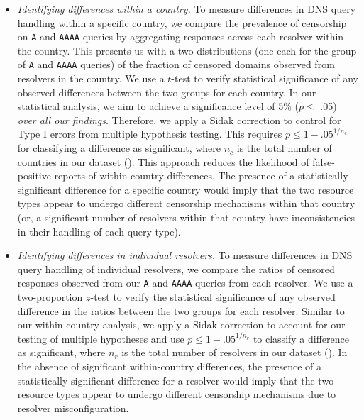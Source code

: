 \begin{itemize}
  \item {\it Identifying differences within a country.} To measure differences
    in DNS query handling within a specific country, we compare the prevalence
    of censorship on {\tt A} and {\tt AAAA} queries by aggregating responses
    across {each resolver within the country}. This presents us with a two
    distributions (one each for the group of {\tt A} and {\tt AAAA} queries) of
    the fraction of censored domains observed from resolvers in the country.
    We use a $t$-test to verify statistical significance of any observed
    differences between the two groups for each country. In our statistical
    analysis, we aim to achieve a significance level of 5\% ($p \leq$  .05)
    \emph{over all our findings}. Therefore, we apply a Sidak correction
    \cite{Sidak} to control for Type I errors from multiple hypothesis testing.
    This requires $p \leq 1-{.05}^{1/n_{c}}$ for classifying a difference as
    significant, where $n_c$ is the total number of countries in our dataset
    (). This approach reduces the likelihood of false-positive
    reports of within-country differences.
    The presence of a statistically significant difference for a specific
    country would imply that the two resource types appear to undergo different
    censorship mechanisms within that country (or, a significant number of
    resolvers within that country have inconsistencies in their handling of
    each query type).

  \item {\it Identifying differences in individual resolvers.} To measure
    differences in DNS query handling of individual resolvers, we compare the
    ratios of censored responses observed from our {\tt A} and {\tt AAAA}
    queries {from each resolver}. 
    We use a two-proportion $z$-test to verify the statistical significance of
    any observed difference in the ratios between the two groups for each
    resolver. Similar to our within-country analysis, we apply a Sidak
    correction to account for our testing of multiple hypotheses and use $p
    \leq 1-{.05}^{1/n_r}$ to classify a difference as significant, where $n_r$
    is the total number of resolvers in our dataset ().
    In the absence of significant within-country differences, the presence of
    a statistically significant difference for a resolver would imply that the
    two resource types appear to undergo different censorship mechanisms due to
    resolver misconfiguration.


\end{itemize}
